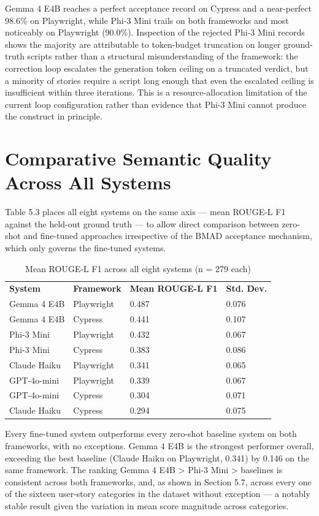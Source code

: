 Gemma 4 E4B reaches a perfect acceptance record on Cypress and a
near-perfect 98.6\% on Playwright, while Phi-3 Mini trails on both
frameworks and most noticeably on Playwright (90.0\%). Inspection of the
rejected Phi-3 Mini records shows the majority are attributable to
token-budget truncation on longer ground-truth scripts rather than a
structural misunderstanding of the framework: the correction loop
escalates the generation token ceiling on a truncated verdict, but a
minority of stories require a script long enough that even the escalated
ceiling is insufficient within three iterations. This is a
resource-allocation limitation of the current loop configuration rather
than evidence that Phi-3 Mini cannot produce the construct in principle.

\section{Comparative Semantic Quality Across All Systems}

Table 5.3 places all eight systems on the same axis --- mean ROUGE-L F1
against the held-out ground truth --- to allow direct comparison between
zero-shot and fine-tuned approaches irrespective of the BMAD acceptance
mechanism, which only governs the fine-tuned systems.

\begin{longtable}[]{@{}llll@{}}
\caption{Mean ROUGE-L F1 across all eight systems (n = 279 each)}\tabularnewline
\toprule
\endhead
\textbf{System} & \textbf{Framework} & \textbf{Mean ROUGE-L F1} &
\textbf{Std. Dev.} \\
Gemma 4 E4B & Playwright & 0.487 & 0.076 \\
Gemma 4 E4B & Cypress & 0.441 & 0.107 \\
Phi-3 Mini & Playwright & 0.432 & 0.067 \\
Phi-3 Mini & Cypress & 0.383 & 0.086 \\
Claude Haiku & Playwright & 0.341 & 0.065 \\
GPT-4o-mini & Playwright & 0.339 & 0.067 \\
GPT-4o-mini & Cypress & 0.304 & 0.071 \\
Claude Haiku & Cypress & 0.294 & 0.075 \\
\bottomrule
\end{longtable}

Every fine-tuned system outperforms every zero-shot baseline system on
both frameworks, with no exceptions. Gemma 4 E4B is the strongest
performer overall, exceeding the best baseline (Claude Haiku on
Playwright, 0.341) by 0.146 on the same framework. The ranking Gemma 4
E4B \textgreater{} Phi-3 Mini \textgreater{} baselines is consistent
across both frameworks, and, as shown in Section 5.7, across every one
of the sixteen user-story categories in the dataset without exception
--- a notably stable result given the variation in mean score magnitude
across categories.

